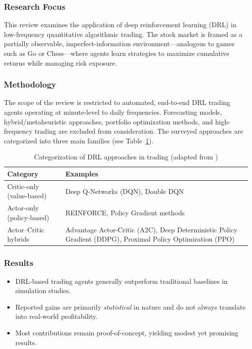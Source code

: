 \documentclass[12pt,a4paper]{report}
\begin{document}
\subsubsection{Research Focus}
This review examines the application of deep reinforcement learning (DRL) in low-frequency quantitative algorithmic trading. The stock market is framed as a partially observable, imperfect-information environment—analogous to games such as Go or Chess—where agents learn strategies to maximize cumulative returns while managing risk exposure.

\subsubsection{Methodology}
The scope of the review is restricted to automated, end-to-end DRL trading agents operating at minute-level to daily frequencies. Forecasting models, hybrid/metaheuristic approaches, portfolio optimization methods, and high-frequency trading are excluded from consideration. The surveyed approaches are categorized into three main families (see Table~\ref{tab:drl-families}).

\begin{table}[h]
\centering
\caption{Categorization of DRL approaches in trading (adapted from \cite{pricope2021deep})}
\label{tab:drl-families}
\begin{tabular}{p{4cm} p{8.5cm}}
\toprule
\textbf{Category} & \textbf{Examples} \\
\midrule
Critic-only (value-based) & Deep Q-Networks (DQN), Double DQN \\
Actor-only (policy-based) & REINFORCE, Policy Gradient methods \\
Actor–Critic hybrids & Advantage Actor-Critic (A2C), Deep Deterministic Policy Gradient (DDPG), Proximal Policy Optimization (PPO) \\
\bottomrule
\end{tabular}
\end{table}

\subsubsection{Results}
\begin{itemize}
    \item DRL-based trading agents generally outperform traditional baselines in simulation studies.  
    \item Reported gains are primarily \textit{statistical} in nature and do not always translate into real-world profitability.  
    \item Most contributions remain proof-of-concept, yielding modest yet promising results.  
\end{itemize}
\end{document}

